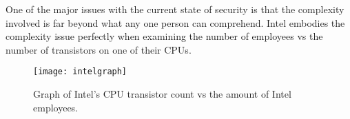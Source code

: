 \label{Ch2 Sec1}

One of the major issues with the current state of security is that the complexity involved is far beyond what any one person can comprehend.
Intel embodies the complexity issue perfectly when examining the number of employees vs the number of transistors on one of their CPUs.\\

\begin{figure}
  \centering
  \texttt{[image: intelgraph]}
  \caption{Graph of Intel's CPU transistor count vs the amount of Intel employees.\\ \cite{Reference28}\cite{Reference29}\cite{Reference30}\cite{Reference31}\cite{Reference32}\cite{Reference33}\cite{Reference34}\cite{Reference35}
}
  \label{fig:intelgraph}
\end{figure}


